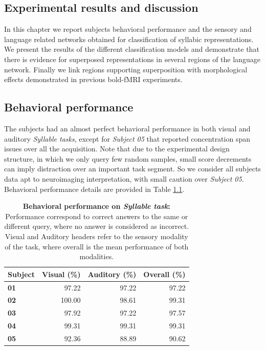 \begin{fullwidth}
\chapter{\label{ch:super_syllables}
Experimental results and discussion}
\end{fullwidth}

\begin{chabstract}

In this chapter we report subjects behavioral performance and the sensory and language related networks obtained for classification of syllabic representations. We present the results of the different classification models and demonstrate that there is evidence for superposed representations in several regions of the language network. Finally we link regions supporting superposition with morphological effects demonstrated in previous bold-fMRI experiments.

\end{chabstract}


\section{Behavioral performance}
%
The subjects had an almost perfect behavioral performance in both visual and auditory \emph{Syllable tasks}, except for \emph{Subject 05} that reported concentration span issues over all the acquisition.
Note that due to the experimental design structure, in which we only query few random samples, small score decrements can imply distraction over an important task segment.
So we consider all subjects data apt to neuroimaging interpretation, with small caution over \emph{Subject 05}. Behavioral performance details are provided in Table \ref{table:behavior}.


\begin{table}
\begin{tabular}{|>{\bfseries}l|rrr|}
\toprule
Subject &  Visual (\%) &  Auditory (\%) &  Overall (\%) \\
\midrule
01 &        97.22 &          97.22 &    97.22 \\
02 &       100.00 &          98.61 &    99.31 \\
03 &        97.92 &          97.22 &    97.57 \\
04 &        99.31 &          99.31 &    99.31 \\
05 &        92.36 &          88.89 &    90.62 \\
\bottomrule
\end{tabular}
\caption{\textbf{Behavioral performance on \emph{Syllable task}:} Performance correspond to correct answers to the same or different query, where no answer is considered as incorrect. Visual and Auditory headers refer to the sensory modality of the task, where overall is the mean performance of both modalities.}
\label{table:behavior}
\end{table}


